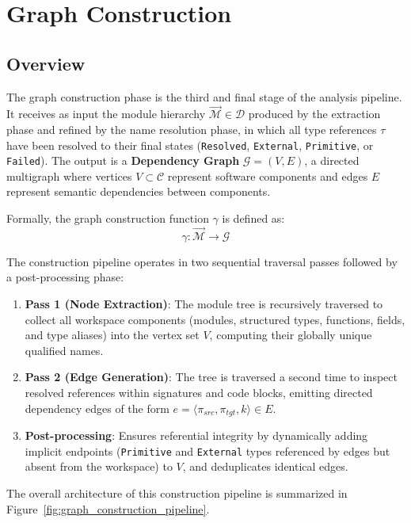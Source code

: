 \chapter{Graph Construction}
\label{ch:graph_construction}

\section{Overview}
\label{sec:graph_overview}

The graph construction phase is the third and final stage of the
analysis pipeline. It receives as input the module hierarchy
$\vec{\mathcal{M}} \in \mathcal{D}$ produced by the extraction phase and
refined by the name resolution phase, in which all type references
$\tau$ have been resolved to their final states (\texttt{Resolved},
\texttt{External}, \texttt{Primitive}, or \texttt{Failed}). The output is
a \textbf{Dependency Graph} $\mathcal{G} = (V, E)$, a directed multigraph
where vertices $V \subset \mathcal{C}$ represent software components and
edges $E$ represent semantic dependencies between components.

Formally, the graph construction function $\gamma$ is defined as:
$$\gamma : \vec{\mathcal{M}} \to \mathcal{G}$$

The construction pipeline operates in two sequential traversal passes
followed by a post-processing phase:
\begin{enumerate}
  \item \textbf{Pass 1 (Node Extraction)}: The module tree is
    recursively traversed to collect all workspace components (modules,
    structured types, functions, fields, and type aliases) into the vertex
    set $V$, computing their globally unique qualified names.
  \item \textbf{Pass 2 (Edge Generation)}: The tree is traversed a second
    time to inspect resolved references within signatures and code blocks,
    emitting directed dependency edges of the form
    $e = \langle \pi_{src}, \pi_{tgt}, k \rangle \in E$.
  \item \textbf{Post-processing}: Ensures referential integrity by
    dynamically adding implicit endpoints (\texttt{Primitive} and
      \texttt{External} types referenced by edges but absent from the
    workspace) to $V$, and deduplicates identical edges.
\end{enumerate}

The overall architecture of this construction pipeline is summarized
in Figure~\ref{fig:graph_construction_pipeline}.

